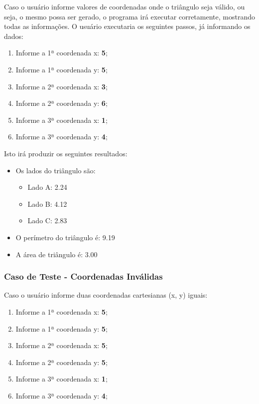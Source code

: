 	Caso o usuário informe valores de coordenadas onde o triângulo seja válido, ou seja, o mesmo possa ser gerado, o
	programa irá executar corretamente, mostrando todas as informações. O usuário executaria os seguintes passos, já
	informando os dados:

	\begin{enumerate}
		\item Informe a 1ª coordenada x: \textbf{5};
		\item Informe a 1ª coordenada y: \textbf{5};

		\item Informe a 2ª coordenada x: \textbf{3};
		\item Informe a 2ª coordenada y: \textbf{6};

		\item Informe a 3ª coordenada x: \textbf{1};
		\item Informe a 3ª coordenada y: \textbf{4};
	\end{enumerate}


	Isto irá produzir os seguintes resultados:

	\begin{itemize}
  	\item Os lados do triângulo são:
	  \begin{itemize}
	    \item Lado A: 2.24
	    \item Lado B: 4.12
	    \item Lado C: 2.83
	  \end{itemize}
	  \item O perímetro do triângulo é: 9.19
		\item A área de triângulo é: 3.00
	\end{itemize}

	\subsubsection{Caso de Teste - Coordenadas Inválidas}

	Caso o usuário informe duas coordenadas cartesianas (x, y) iguais:

	\begin{enumerate}
		\item Informe a 1ª coordenada x: \textbf{5};
		\item Informe a 1ª coordenada y: \textbf{5};

		\item Informe a 2ª coordenada x: \textbf{5};
		\item Informe a 2ª coordenada y: \textbf{5};

		\item Informe a 3ª coordenada x: \textbf{1};
		\item Informe a 3ª coordenada y: \textbf{4};
	\end{enumerate}

